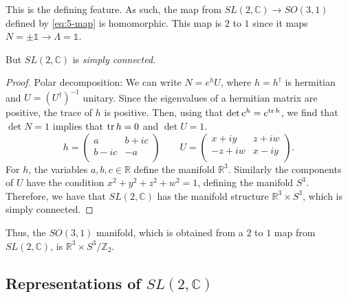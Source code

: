 This is the defining feature. As such, the map from $SL(2, \mathbb{C}) \to SO(3, 1)$ defined by \eqref{eq:5-map} is homomorphic.
This map is $2$ to $1$ since it maps $N = \pm \mathbb{1} \to \Lambda = \mathbb{1}$.

\begin{claim}
  But $SL(2, \mathbb{C})$ is \emph{simply connected.}
\end{claim}
\begin{proof}
  Polar decomposition: We can write $N = e^{h} U$, where $h = h^{\dagger}$ is hermitian and $U = (U^{\dagger})^{-1}$ unitary.
  Since the eigenvalues of a hermitian matrix are positive, the trace of $h$ is positive.
  Then, using that $\det e^h = e^{\tr h}$, we find that $\det N = 1$ implies that $\tr h = 0$ and $\det U = 1$.
  \begin{equation}
    h =
    \begin{pmatrix}
     a & b+ic \\
     b-ic & -a \\
    \end{pmatrix}
    \qquad U = 
    \begin{pmatrix}
     x + i y & z + i w \\
     -z + i w & x - i y \\
    \end{pmatrix}.
  \end{equation}
  For $h$, the variables $a, b, c \in \mathbb{R}$ define the manifold $\mathbb{R}^3$.
  Similarly the components of $U$ have the condition $x^2 + y^2 + z^2 + w^2 = 1$, defining the manifold $S^3$.
  Therefore, we have that $SL(2, \mathbb{C})$ has the manifold structure $\mathbb{R}^3 \times S^3$, which is simply connected.
\end{proof}
\begin{corollary}
  Thus, the $SO(3, 1)$ manifold, which is obtained from a $2$ to $1$ map from $SL(2, \mathbb{C})$, is $\mathbb{R}^3 \times S^3 / \mathbb{Z}_2$.
\end{corollary}

\subsection*{Representations of $SL(2, \mathbb{C})$}%

